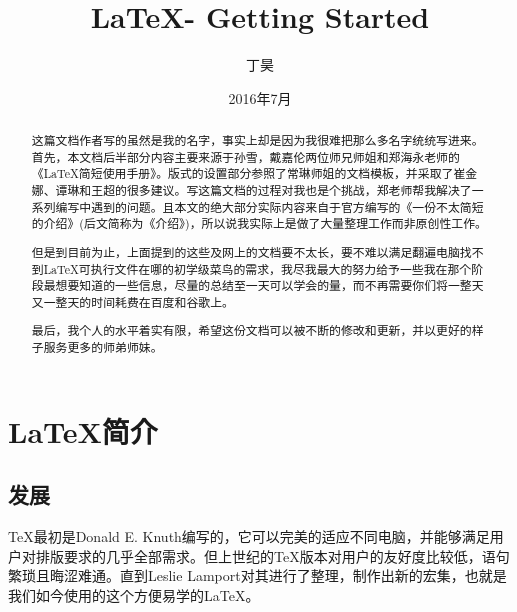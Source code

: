 \documentclass{article}
\begin{document}
\title{\vspace{-2em}\LaTeX  - Getting Started\vspace{0.7em}}
\author{丁昊}%
\date{\vspace{-0.7em}2016年7月\vspace{-0.7em}}%
\maketitle\thispagestyle{fancy}%
\newpage
\tableofcontents
\newpage


\begin{abstract}
这篇文档作者写的虽然是我的名字，事实上却是因为我很难把那么多名字统统写进来。首先，本文档后半部分内容主要来源于孙雪，戴嘉伦两位师兄师姐和郑海永老师的《\LaTeX 简短使用手册》。版式的设置部分参照了常琳师姐的文档模板，并采取了崔金娜、谭琳和王超的很多建议。写这篇文档的过程对我也是个挑战，郑老师帮我解决了一系列编写中遇到的问题。且本文的绝大部分实际内容来自于官方编写的《一份不太简短的\LaTeXe 介绍》(后文简称为《介绍》)，所以说我实际上是做了大量整理工作而非原创性工作。\par
但是到目前为止，上面提到的这些及网上的文档要不太长，要不难以满足翻遍电脑找不到\LaTeX 可执行文件在哪的初学级菜鸟的需求，我尽我最大的努力给予一些我在那个阶段最想要知道的一些信息，尽量的总结至一天可以学会的量，而不再需要你们将一整天又一整天的时间耗费在百度和谷歌上。\par
最后，我个人的水平着实有限，希望这份文档可以被不断的修改和更新，并以更好的样子服务更多的师弟师妹。
\end{abstract}
\newpage


\section{\LaTeX 简介}

\subsection{发展}

\TeX 最初是Donald E. Knuth编写的，它可以完美的适应不同电脑，并能够满足用户对排版要求的几乎全部需求。但上世纪的\TeX 版本对用户的友好度比较低，语句繁琐且晦涩难通。直到Leslie Lamport对其进行了整理，制作出新的宏集，也就是我们如今使用的这个方便易学的\LaTeX 。
\end{document}
